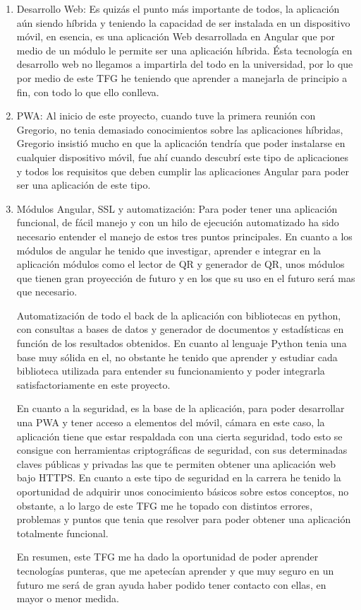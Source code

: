 \documentclass[a4paper, 12pt]{book}
\begin{document}
\begin{enumerate}
  \item Desarrollo Web: Es quizás el punto más importante de todos, la aplicación aún siendo híbrida y teniendo la capacidad de ser instalada en un dispositivo móvil, en esencia, es una aplicación Web desarrollada en Angular que por medio de un módulo le permite ser una aplicación híbrida. Ésta tecnología en desarrollo web no llegamos a impartirla del todo en la universidad, por lo que por medio de este TFG he teniendo que aprender a manejarla de principio a fin, con todo lo que ello conlleva.
  
  \item PWA: Al inicio de este proyecto, cuando tuve la primera reunión con Gregorio, no tenia demasiado conocimientos sobre las aplicaciones híbridas, Gregorio insistió mucho en que la aplicación tendría que poder instalarse en cualquier dispositivo móvil, fue ahí cuando descubrí este tipo de aplicaciones y todos los requisitos que deben cumplir las aplicaciones Angular para poder ser una aplicación de este tipo.
  
	\item Módulos Angular, SSL y automatización: Para poder tener una aplicación funcional, de fácil manejo y con un hilo de ejecución automatizado ha sido necesario entender el manejo de estos tres puntos principales. En cuanto a los módulos de angular he tenido que investigar, aprender e integrar en la aplicación módulos como el lector de QR y generador de QR, unos módulos que tienen gran proyección de futuro y en los que su uso en el futuro será mas que necesario.
	
	Automatización de todo el back de la aplicación con bibliotecas en python, con consultas a bases de datos y generador de documentos y estadísticas en función de los resultados obtenidos. En cuanto al lenguaje Python tenia una base muy sólida en el, no obstante he tenido que aprender y estudiar cada biblioteca utilizada para entender su funcionamiento y poder integrarla satisfactoriamente en este proyecto.
	
	En cuanto a la seguridad, es la base de la aplicación, para poder desarrollar una PWA y tener acceso a elementos del móvil, cámara en este caso, la aplicación tiene que estar respaldada con una cierta seguridad, todo esto se consigue con herramientas criptográficas de seguridad, con sus determinadas claves públicas y privadas las que te permiten obtener una aplicación web bajo HTTPS. En cuanto a este tipo de seguridad en la carrera he tenido la oportunidad de adquirir unos conocimiento básicos sobre estos conceptos, no obstante, a lo largo de este TFG me he topado con distintos errores, problemas y puntos que tenia que resolver para poder obtener una  aplicación totalmente funcional.
	
En resumen, este TFG me ha dado la oportunidad de poder aprender tecnologías punteras, que me apetecían aprender y que muy seguro en un futuro me será de gran ayuda haber podido tener contacto con ellas, en mayor o menor medida.
\end{enumerate}
\end{document}
